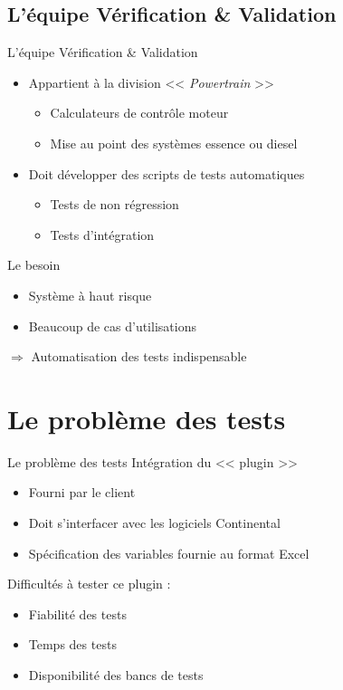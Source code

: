 \documentclass{beamer}
\begin{document}
\subsection{L'\'equipe V\'erification \& Validation}
\begin{frame}{L'\'equipe V\'erification \& Validation}

	\begin{itemize}

		\item Appartient à la division << \textit{Powertrain} >>
			\begin{itemize}
				\item Calculateurs de contrôle moteur
				\item Mise au point des systèmes essence ou diesel
			\end{itemize}
	\end{itemize}
	
	\begin{itemize}
			\pause
		\item Doit développer des scripts de tests automatiques
			\begin{itemize}
				\item Tests de non régression
				\item Tests d'intégration
			\end{itemize}
	\end{itemize}
	\vfill
	\pause
	\begin{block}{Le besoin}
		\begin{itemize}
			\item Système à haut risque 
			\item Beaucoup de cas d'utilisations 
		\end{itemize}
	\end{block}
	\pause
	\hspace{30px} $\Rightarrow$ Automatisation des tests indispensable
\end{frame}
\section{Le probl\`eme des tests}
\begin{frame}{Le problème des tests}
	\vfill
	Intégration du << plugin >>
	\vspace{-10px}
			\begin{itemize}
				\item Fourni par le client
				\item Doit s'interfacer avec les logiciels Continental 
				\item Spécification des variables fournie au format Excel
			\end{itemize}
			\pause
	\vfill
	Difficultés à tester ce plugin : 
	\vspace{-10px}
	\begin{itemize}
		\item Fiabilité des tests
		\item Temps des tests
		\item Disponibilité des bancs de tests
	\end{itemize}
	\vfill
\end{frame}
\end{document}
